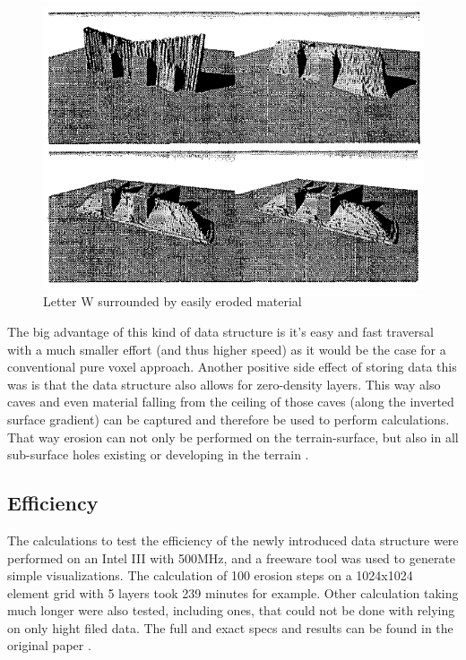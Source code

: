 \begin{figure}[htb]
	\centering
	\includegraphics[width=\linewidth]{MGG_10/8582.png}
	\caption{Letter W surrounded by easily eroded material}
	\label{fig:erosiondifference}
\end{figure}

The big advantage of this kind of data structure is it's easy and fast traversal with a much smaller effort (and thus higher speed) as it would be the case for a conventional pure voxel approach. Another positive side effect of storing data this was is that the data structure also allows for zero-density layers. This way also caves and even material falling from the ceiling of those caves (along the inverted surface gradient) can be captured and therefore be used to perform calculations. That way erosion can not only be performed on the terrain-surface, but also in all sub-surface holes existing or developing in the terrain \cite{marechal2010heat}.


\subsection{Efficiency}
The calculations to test the efficiency of the newly introduced data structure were performed on an Intel III with 500MHz, and a freeware tool was used to generate simple visualizations. The calculation of 100 erosion steps on a 1024x1024 element grid with 5 layers took 239 minutes for example. Other calculation taking much longer were also tested, including ones, that could not be done with relying on only hight filed data. The full and exact specs and results can be found in the original paper \cite{marechal2010heat}.